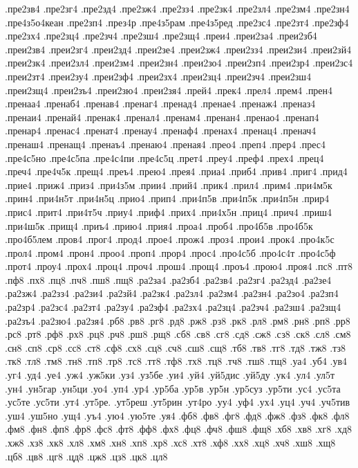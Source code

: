 {.пре2зв4
.пре2зг4
.пре2зд4
.пре2зж4
.пре2зз4
.пре2зк4
.пре2зл4
.пре2зм4
.пре2зн4
.пре4з5о4кеан
.пре2зп4
.през4р
.пре4з5рам
.пре4з5ред
.пре2зс4
.пре2зт4
.пре2зф4
.пре2зх4
.пре2зц4
.пре2зч4
.пре2зш4
.пре2зщ4
.преи4
.преи2за4
.преи2зб4
.преи2зв4
.преи2зг4
.преи2зд4
.преи2зе4
.преи2зж4
.преи2зз4
.преи2зи4
.преи2зй4
.преи2зк4
.преи2зл4
.преи2зм4
.преи2зн4
.преи2зо4
.преи2зп4
.преи2зр4
.преи2зс4
.преи2зт4
.преи2зу4
.преи2зф4
.преи2зх4
.преи2зц4
.преи2зч4
.преи2зш4
.преи2зщ4
.преи2зъ4
.преи2зю4
.преи2зя4
.прей4
.прек4
.прел4
.прем4
.прен4
.пренаа4
.пренаб4
.пренав4
.пренаг4
.пренад4
.пренае4
.пренаж4
.преназ4
.пренаи4
.пренай4
.пренак4
.пренал4
.пренам4
.пренан4
.пренао4
.пренап4
.пренар4
.пренас4
.пренат4
.пренау4
.пренаф4
.пренах4
.пренац4
.пренач4
.пренаш4
.пренащ4
.пренаъ4
.пренаю4
.преная4
.прео4
.преп4
.прер4
.прес4
.пре4с5но
.пре4с5па
.пре4с4пи
.пре4с5ц
.прет4
.преу4
.преф4
.прех4
.прец4
.преч4
.пре4ч5к
.прещ4
.преъ4
.прею4
.прея4
.приа4
.приб4
.прив4
.приг4
.прид4
.прие4
.приж4
.приз4
.при4з5м
.прии4
.прий4
.прик4
.прил4
.прим4
.при4м5к
.прин4
.при4н5т
.при4н5ц
.прио4
.прип4
.при4п5в
.при4п5к
.при4п5н
.прир4
.прис4
.прит4
.при4т5ч
.приу4
.приф4
.прих4
.при4х5н
.приц4
.прич4
.приш4
.при4ш5к
.прищ4
.приъ4
.прию4
.прия4
.проа4
.проб4
.про4б5в
.про4б5к
.про4б5лем
.пров4
.прог4
.прод4
.прое4
.прож4
.проз4
.прои4
.прок4
.про4к5с
.прол4
.пром4
.прон4
.проо4
.проп4
.прор4
.прос4
.про4с5б
.про4с4т
.про4с5ф
.прот4
.проу4
.прох4
.проц4
.проч4
.прош4
.прощ4
.проъ4
.прою4
.проя4
.пс8
.пт8
.пф8
.пх8
.пц8
.пч8
.пш8
.пщ8
.ра2за4
.ра2зб4
.ра2зв4
.ра2зг4
.ра2зд4
.ра2зе4
.ра2зж4
.ра2зз4
.ра2зи4
.ра2зй4
.ра2зк4
.ра2зл4
.ра2зм4
.ра2зн4
.ра2зо4
.ра2зп4
.ра2зр4
.ра2зс4
.ра2зт4
.ра2зу4
.ра2зф4
.ра2зх4
.ра2зц4
.ра2зч4
.ра2зш4
.ра2зщ4
.ра2зъ4
.ра2зю4
.ра2зя4
.рб8
.рв8
.рг8
.рд8
.рж8
.рз8
.рк8
.рл8
.рм8
.рн8
.рп8
.рр8
.рс8
.рт8
.рф8
.рх8
.рц8
.рч8
.рш8
.рщ8
.сб8
.св8
.сг8
.сд8
.сж8
.сз8
.ск8
.сл8
.см8
.сн8
.сп8
.ср8
.сс8
.ст8
.сф8
.сх8
.сц8
.сч8
.сш8
.сщ8
.тб8
.тв8
.тг8
.тд8
.тж8
.тз8
.тк8
.тл8
.тм8
.тн8
.тп8
.тр8
.тс8
.тт8
.тф8
.тх8
.тц8
.тч8
.тш8
.тщ8
.уа4
.уб4
.ув4
.уг4
.уд4
.уе4
.уж4
.уж5ки
.уз4
.уз5бе
.уи4
.уй4
.уй5дис
.уй5ду
.ук4
.ул4
.ул5т
.ун4
.ун5гар
.ун5ци
.уо4
.уп4
.ур4
.ур5ба
.ур5в
.ур5н
.ур5суз
.ур5ти
.ус4
.ус5та
.ус5те
.ус5ти
.ут4
.ут5ре.
.ут5реш
.ут5рин
.ут4ро
.уу4
.уф4
.ух4
.уц4
.уч4
.уч5тив
.уш4
.уш5но
.ущ4
.уъ4
.ую4
.ую5те
.уя4
.фб8
.фв8
.фг8
.фд8
.фж8
.фз8
.фк8
.фл8
.фм8
.фн8
.фп8
.фр8
.фс8
.фт8
.фф8
.фх8
.фц8
.фч8
.фш8
.фщ8
.хб8
.хв8
.хг8
.хд8
.хж8
.хз8
.хк8
.хл8
.хм8
.хн8
.хп8
.хр8
.хс8
.хт8
.хф8
.хх8
.хц8
.хч8
.хш8
.хщ8
.цб8
.цв8
.цг8
.цд8
.цж8
.цз8
.цк8
.цл8
}
